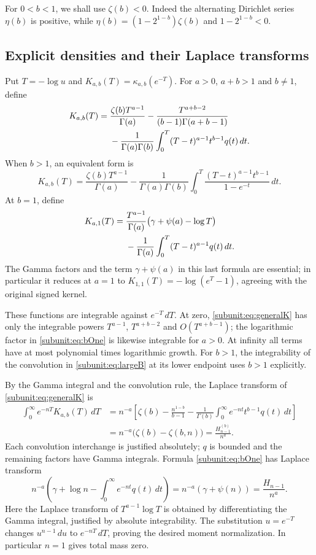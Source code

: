 For $0<b<1$, we shall use $\zeta(b)<0$. Indeed the alternating
Dirichlet series $\eta(b)$ is positive, while
$\eta(b)=(1-2^{1-b})\zeta(b)$ and $1-2^{1-b}<0$.

\subsection{Explicit densities and their Laplace transforms}

Put $T=-\log u$ and $K_{a,b}(T)=\kappa_{a,b}(e^{-T})$. For
$a>0$, $a+b>1$ and $b\ne1$, define
\begin{align}\label{subunit:eq:generalK}
 K_{a,b}(T)={}&\frac{\zeta(b)T^{a-1}}{\Gamma(a)}
 -\frac{T^{a+b-2}}{(b-1)\Gamma(a+b-1)}\notag\\
 &-\frac1{\Gamma(a)\Gamma(b)}
    \int_0^T(T-t)^{a-1}t^{b-1}q(t)\,dt.
\end{align}
When $b>1$, an equivalent form is
\begin{equation}\label{subunit:eq:largeB}
 K_{a,b}(T)=\frac{\zeta(b)T^{a-1}}{\Gamma(a)}
 -\frac1{\Gamma(a)\Gamma(b)}
   \int_0^T\frac{(T-t)^{a-1}t^{b-1}}{1-e^{-t}}\,dt.
\end{equation}
At $b=1$, define
\begin{align}\label{subunit:eq:bOne}
 K_{a,1}(T)={}&\frac{T^{a-1}}{\Gamma(a)}
       \bigl(\gamma+\psi(a)-\log T\bigr)\notag\\
 &-\frac1{\Gamma(a)}\int_0^T(T-t)^{a-1}q(t)\,dt.
\end{align}
The Gamma factors and the term $\gamma+\psi(a)$ in this last formula
are essential; in particular it reduces at $a=1$ to
$K_{1,1}(T)=-\log(e^T-1)$, agreeing with the original signed kernel.

These functions are integrable against $e^{-T}\,dT$. At zero,
\eqref{subunit:eq:generalK} has only the integrable powers
$T^{a-1}$, $T^{a+b-2}$ and $O(T^{a+b-1})$; the logarithmic factor
in \eqref{subunit:eq:bOne} is likewise integrable for $a>0$.
At infinity all terms have at most polynomial times logarithmic growth.
For $b>1$, the integrability of the convolution in
\eqref{subunit:eq:largeB} at its lower endpoint uses $b>1$ explicitly.

By the Gamma integral and the convolution rule, the Laplace transform
of \eqref{subunit:eq:generalK} is
\begin{align*}
 \int_0^\infty e^{-nT}K_{a,b}(T)\,dT
  &=n^{-a}\left[\zeta(b)-\frac{n^{1-b}}{b-1}
     -\frac1{\Gamma(b)}\int_0^\infty
                         e^{-nt}t^{b-1}q(t)\,dt\right]\\
  &=n^{-a}\bigl(\zeta(b)-\zeta(b,n)\bigr)
   =\frac{H_{n-1}^{(b)}}{n^a}.
\end{align*}
Each convolution interchange is justified absolutely; $q$ is bounded
and the remaining factors have Gamma integrals. Formula
\eqref{subunit:eq:bOne} has Laplace transform
\[
 n^{-a}\left(\gamma+\log n-\int_0^\infty e^{-nt}q(t)\,dt\right)
 =n^{-a}(\gamma+\psi(n))=\frac{H_{n-1}}{n^a}.
\]
Here the Laplace transform of $T^{a-1}\log T$ is obtained by
differentiating the Gamma integral, justified by absolute integrability.
The substitution $u=e^{-T}$ changes $u^{n-1}\,du$ to
$e^{-nT}\,dT$, proving the desired moment normalization. In particular
$n=1$ gives total mass zero.

